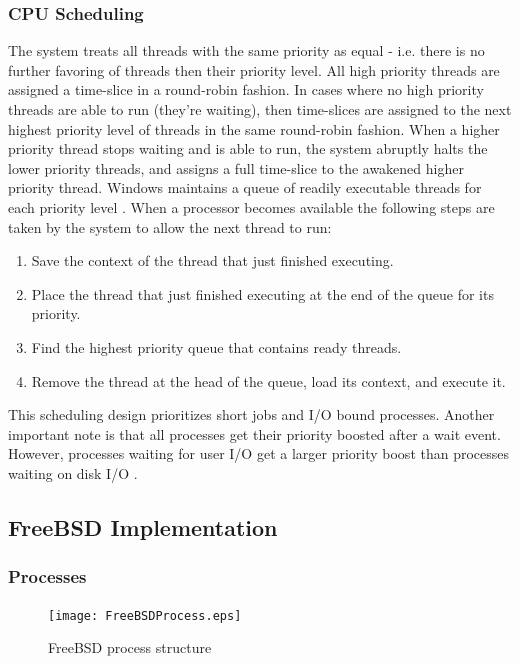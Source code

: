 \documentclass[onecolumn,draftclsnofoot, 10pt, compsoc]{IEEEtran}
\begin{document}
		\subsubsection{CPU Scheduling}
			The system treats all threads with the same priority as equal - i.e. there is no further favoring of threads then their priority level.
			All high priority threads are assigned a time-slice in a round-robin fashion. 
			In cases where no high priority threads are able to run (they're waiting), then time-slices are assigned to the next highest priority level of threads in the same round-robin fashion.
			When a higher priority thread stops waiting and is able to run, the system abruptly halts the lower priority threads, and assigns a full time-slice to the awakened higher priority thread.
			Windows maintains a queue of readily executable threads for each priority level \cite{windowsCSwitchesMSDN}.
			When a processor becomes available the following steps are taken by the system to allow the next thread to run:
			\begin{enumerate}
				\item Save the context of the thread that just finished executing.
				\item Place the thread that just finished executing at the end of the queue for its priority.
				\item Find the highest priority queue that contains ready threads.
				\item Remove the thread at the head of the queue, load its context, and execute it.
			\end{enumerate}
			This scheduling design prioritizes short jobs and I/O bound processes. 
			Another important note is that all processes get their priority boosted after a wait event. However, processes waiting for user I/O get a larger priority boost than processes waiting on disk I/O \cite{schedulerWindows}. 




	\subsection{FreeBSD Implementation}
		\subsubsection{Processes}
			\begin{figure}[H]
				\texttt{[image: FreeBSDProcess.eps]}
				\centering
				\caption{FreeBSD process structure \cite{freeBSDProcess}}
				\label{fig:mesh2}
			\end{figure}
		
\end{document}
